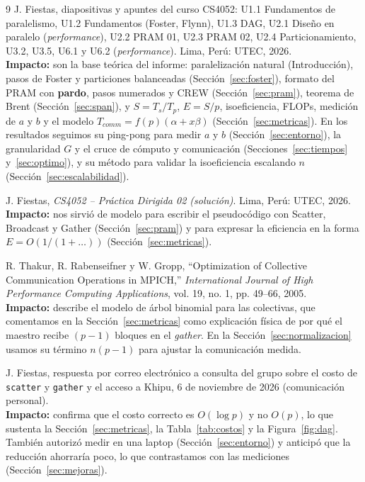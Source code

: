 \documentclass[11pt,a4paper]{article}
\begin{document}
\begin{thebibliography}{9}
 J. Fiestas, diapositivas y apuntes del curso CS4052: U1.1 Fundamentos de paralelismo, U1.2 Fundamentos (Foster, Flynn), U1.3 DAG, U2.1 Diseño en paralelo (\textit{performance}), U2.2 PRAM 01, U2.3 PRAM 02, U2.4 Particionamiento, U3.2, U3.5, U6.1 y U6.2 (\textit{performance}). Lima, Perú: UTEC, 2026.\\
\textbf{Impacto:} son la base teórica del informe: paralelización natural (Introducción), pasos de Foster y particiones balanceadas (Sección~\ref{sec:foster}), formato del PRAM con \textbf{pardo}, pasos numerados y CREW (Sección~\ref{sec:pram}), teorema de Brent (Sección~\ref{sec:span}), y $S=T_s/T_p$, $E=S/p$, isoeficiencia, FLOPs, medición de $a$ y $b$ y el modelo $T_{comm}=f(p)(\alpha+x\beta)$ (Sección~\ref{sec:metricas}). En los resultados seguimos su ping-pong para medir $a$ y $b$ (Sección~\ref{sec:entorno}), la granularidad $G$ y el cruce de cómputo y comunicación (Secciones~\ref{sec:tiempos} y~\ref{sec:optimo}), y su método para validar la isoeficiencia escalando $n$ (Sección~\ref{sec:escalabilidad}).

 J. Fiestas, \textit{CS4052 -- Práctica Dirigida 02 (solución)}. Lima, Perú: UTEC, 2026.\\
\textbf{Impacto:} nos sirvió de modelo para escribir el pseudocódigo con Scatter, Broadcast y Gather (Sección~\ref{sec:pram}) y para expresar la eficiencia en la forma $E=O(1/(1+\dots))$ (Sección~\ref{sec:metricas}).

 R. Thakur, R. Rabenseifner y W. Gropp, ``Optimization of Collective Communication Operations in MPICH,'' \textit{International Journal of High Performance Computing Applications}, vol. 19, no. 1, pp. 49--66, 2005.\\
\textbf{Impacto:} describe el modelo de árbol binomial para las colectivas, que comentamos en la Sección~\ref{sec:metricas} como explicación física de por qué el maestro recibe $(p-1)$ bloques en el \textit{gather}. En la Sección~\ref{sec:normalizacion} usamos su término $n(p-1)$ para ajustar la comunicación medida.

 J. Fiestas, respuesta por correo electrónico a consulta del grupo sobre el costo de \texttt{scatter} y \texttt{gather} y el acceso a Khipu, 6 de noviembre de 2026 (comunicación personal).\\
\textbf{Impacto:} confirma que el costo correcto es $O(\log p)$ y no $O(p)$, lo que sustenta la Sección~\ref{sec:metricas}, la Tabla~\ref{tab:costos} y la Figura~\ref{fig:dag}. También autorizó medir en una laptop (Sección~\ref{sec:entorno}) y anticipó que la reducción ahorraría poco, lo que contrastamos con las mediciones (Sección~\ref{sec:mejoras}).


\end{thebibliography}
\end{document}
